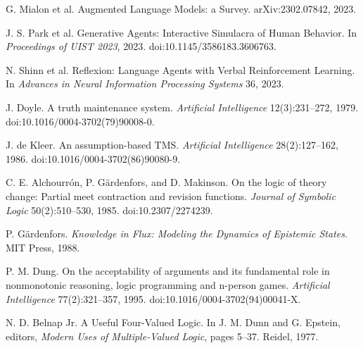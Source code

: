  G. Mialon et al. Augmented Language Models: a Survey. arXiv:2302.07842, 2023.

 J. S. Park et al. Generative Agents: Interactive Simulacra of Human Behavior. In \emph{Proceedings of UIST 2023}, 2023. doi:10.1145/3586183.3606763.

 N. Shinn et al. Reflexion: Language Agents with Verbal Reinforcement Learning. In \emph{Advances in Neural Information Processing Systems} 36, 2023.

 J. Doyle. A truth maintenance system. \emph{Artificial Intelligence} 12(3):231--272, 1979. doi:10.1016/0004-3702(79)90008-0.

 J. de Kleer. An assumption-based TMS. \emph{Artificial Intelligence} 28(2):127--162, 1986. doi:10.1016/0004-3702(86)90080-9.

 C. E. Alchourr\'on, P. G\"ardenfors, and D. Makinson. On the logic of theory change: Partial meet contraction and revision functions. \emph{Journal of Symbolic Logic} 50(2):510--530, 1985. doi:10.2307/2274239.

 P. G\"ardenfors. \emph{Knowledge in Flux: Modeling the Dynamics of Epistemic States}. MIT Press, 1988.

 P. M. Dung. On the acceptability of arguments and its fundamental role in nonmonotonic reasoning, logic programming and n-person games. \emph{Artificial Intelligence} 77(2):321--357, 1995. doi:10.1016/0004-3702(94)00041-X.

 N. D. Belnap Jr. A Useful Four-Valued Logic. In J. M. Dunn and G. Epstein, editors, \emph{Modern Uses of Multiple-Valued Logic}, pages 5--37. Reidel, 1977.

